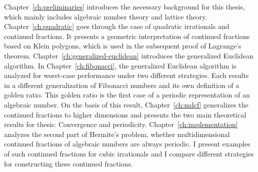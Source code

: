 Chapter~\ref{ch:preliminaries} introduces the necessary background for this thesis,
which mainly includes algebraic number theory and lattice theory.
Chapter~\ref{ch:quadratic} goes through the case of quadratic irrationals and continued fractions.
It presents a geometric interpretation of continued fractions based on Klein polygons,
which is used in the subsequent proof of Lagrange's theorem.
Chapter~\ref{ch:generalized-euclidean} introduces the generalized Euclidean algorithm.
In Chapter~\ref{ch:fibonacci}, the generalized Euclidean algorithm is analyzed
for worst-case performance under two different strategies.
Each results in a different generalization of Fibonacci numbers and its own definition of a golden ratio.
This golden ratio is the first case of a periodic representation of an algebraic number.
On the basis of this result, Chapter~\ref{ch:mdcf} generalizes the continued fractions to higher dimensions
and presents the two main theoretical results for thesis: Convergence and periodicity.
Chapter~\ref{ch:implementation} analyzes the second part of Hermite's problem,
whether multidimensional continued fractions of algebraic numbers are always periodic.
I present examples of such continued fractions for cubic irrationals and I
compare different strategies for constructing these continued fractions.
